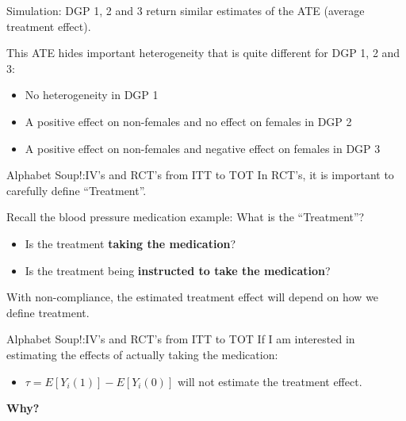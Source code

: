\documentclass[
  ignorenonframetext,
]{beamer}
\providecommand{\tightlist}{%
  \setlength{\itemsep}{0pt}\setlength{\parskip}{0pt}}
\begin{document}
\begin{frame}{Simulation:}
\protect\hypertarget{simulation-3}{}
DGP 1, 2 and 3 return similar estimates of the ATE (average treatment
effect).

This ATE hides important heterogeneity that is quite different for DGP
1, 2 and 3:

\begin{itemize}
\item
  No heterogeneity in DGP 1
\item
  A positive effect on non-females and no effect on females in DGP 2
\item
  A positive effect on non-females and negative effect on females in DGP
  3
\end{itemize}
\end{frame}

\begin{frame}{Alphabet Soup!:IV's and RCT's from ITT to TOT}
\protect\hypertarget{alphabet-soupivs-and-rcts-from-itt-to-tot}{}
In RCT's, it is important to carefully define ``Treatment''.

Recall the blood pressure medication example: What is the ``Treatment''?

\begin{itemize}
\item
  Is the treatment \textbf{taking the medication}?
\item
  Is the treatment being \textbf{instructed to take the medication}?
\end{itemize}

With non-compliance, the estimated treatment effect will depend on how
we define treatment.
\end{frame}

\begin{frame}{Alphabet Soup!:IV's and RCT's from ITT to TOT}
\protect\hypertarget{alphabet-soupivs-and-rcts-from-itt-to-tot-1}{}
If I am interested in estimating the effects of actually taking the
medication:

\begin{itemize}
\tightlist
\item
  \(\tau=E[Y_i(1)]-E[Y_i(0)]\) will not estimate the treatment effect.
\end{itemize}

\textbf{Why?}
\end{frame}
\end{document}
